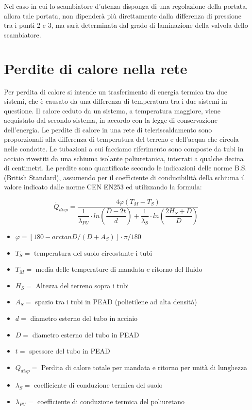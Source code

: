 \documentclass[laurea,oneside,11pt]{USiena_tesiLM}
\begin{document}
Nel caso in cui lo scambiatore d'utenza disponga di una regolazione della portata, allora tale portata, non dipenderà più direttamente dalla differenza di pressione tra i punti 2 e 3, ma sarà determinata dal grado di laminazione della valvola dello scambiatore. 

\section{Perdite di calore nella rete}
Per perdita di calore si intende un trasferimento di 
energia termica tra due sistemi, che è causato da una differenza di temperatura tra i due sistemi in questione. Il calore ceduto da un sistema, a temperatura maggiore, viene acquistato dal secondo sistema, in accordo con la legge di conservazione dell'energia. 
Le perdite di calore in una rete di teleriscaldamento sono proporzionali alla differenza di temperatura del terreno e dell'acqua che circola nelle condotte. Le tubazioni a cui facciamo riferimento sono composte da tubi in acciaio rivestiti da una schiuma isolante poliuretanica, interrati a qualche decina di centimetri.
Le perdite sono quantificate secondo le indicazioni delle norme B.S. (British Standard), assumendo per il coefficiente di conducibilità della schiuma il valore indicato dalle norme CEN EN253 ed utilizzando la formula:

\begin{equation}
\dot{Q}_{disp} = \dfrac{4 \varphi (T_M - T_S)}{\dfrac{1}{\lambda_{PU}} \cdot ln \left(  \dfrac{D - 2t}{d}\right)  + \dfrac{1}{\lambda_S} \cdot ln \left(  \dfrac{2H_S + D}{D}\right) }
\end{equation}

\begin{itemize}
\item $\varphi = \left[ 180 - arctan  D /( D + A_S)  \right] \cdot \pi/180 $  
\item $T_S =$ temperatura del suolo circostante i tubi
\item $T_M =$ media delle temperature di mandata e ritorno del fluido
\item $H_S =$ Altezza del terreno sopra i tubi
\item $A_S =$ spazio tra i tubi in PEAD (polietilene ad alta densità)
\item $d =$ diametro esterno del tubo in acciaio
\item $D =$ diametro esterno del tubo in PEAD
\item $t =$ spessore del tubo in PEAD
\item $Q_{disp} =$ Perdita di calore totale per mandata e ritorno per unità di lunghezza
\item $\lambda_S =$ coefficiente di conduzione termica del suolo
\item $\lambda_{PU} =$ coefficiente di conduzione termica del poliuretano
\end{itemize}
\end{document}
